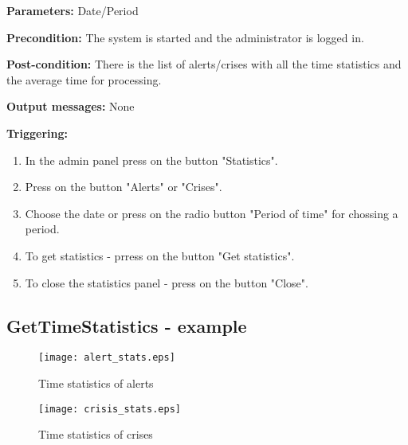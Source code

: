 \begin{description}
	\item \textbf{Parameters:} Date/Period
	\item \textbf{Precondition:} The system is started and the administrator is
	logged in.
	\item \textbf{Post-condition:} There is the list of alerts/crises with all the
	time statistics and the average time for processing.
	\item \textbf{Output messages:} None
	
	\item \textbf{Triggering:}
	
	\begin{enumerate}
		\item In the admin panel press on the button "Statistics".
		\item Press on the button "Alerts" or "Crises".
		\item Choose the date or press on the radio button "Period of time" for
		chossing a period.
		\item To get statistics - prress on the button "Get statistics".
		\item To close the statistics panel - press on the button "Close".
	\end{enumerate}
\end{description}

\subsection{GetTimeStatistics - example}

\begin{figure}[h]
    \texttt{[image: alert\_stats.eps]}
	\caption{Time statistics of alerts}
\end{figure}

\begin{figure}[h] 
    \texttt{[image: crisis\_stats.eps]}
	\caption{Time statistics of crises}
\end{figure}



